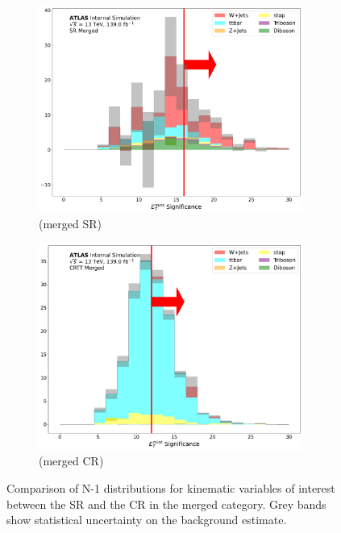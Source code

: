 \begin{figure}[htbp]
 \begin{subfigure}{0.45\textwidth}
     \includegraphics[width = 0.95\textwidth]{Figures/App_SR_CR_distributions/SR1L_Merged/MetTST_Significance_N_1.pdf}
    \caption{\metsig (merged SR)}
     \end{subfigure}
    \begin{subfigure}{0.45\textwidth}
     \includegraphics[width = 0.95\textwidth]{Figures/App_SR_CR_distributions/CRTT_Merged/MetTST_Significance_N_1.pdf}
     \caption{\metsig (merged \ttbar CR)}
     \end{subfigure}
      \caption{Comparison of N-1 distributions for kinematic variables of interest between the SR and the \ttbar CR in the merged category. Grey bands show statistical uncertainty on the background estimate.}
      \label{fig:N_1_CRTT_merged}
       \end{figure}
